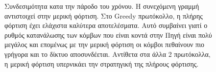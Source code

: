 \begin{figure}[H]
  \centering
  \caption{Συνδεσιμότητα κατα την πάροδο του χρόνου. Η συνεχόμενη γραμμή αντιστοιχεί στην μερική φόρτιση. Στο Greedy πρωτόκολλο, η πλήρης φόρτιση έχει ελάχιστα
καλύτερα αποτελέσματα. Αυτό συμβαίνει γιατί ο ρυθμός κατανάλωσης των κόμβων που είναι κοντά στην Πηγή είναι πολύ μεγάλος και επομένως με την μερική φόρτιση οι κόμβοι
πεθαίνουν πιο γρήγορα και το δίκτυο αποσυνδέεται. Αντίθετα στα άλλα 2 πρωτόκολλα, η μερική φόρτιση υπερνικάει την στρατηγική της πλήρους φόρτισης.}
  \label{fig:2exp_2_1}
\end{figure}


